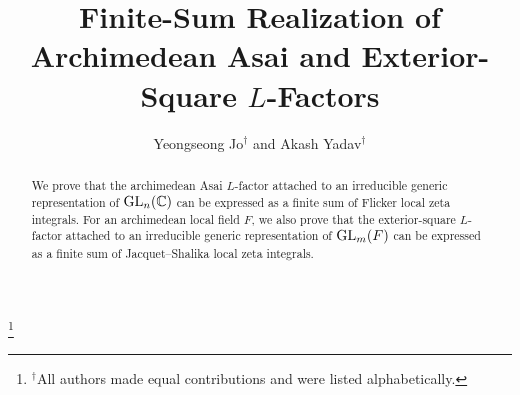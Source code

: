 \documentclass[12pt,reqno]{amsart}
\numberwithin{equation}{section}%
\numberwithin{equation}{subsection}
\theoremstyle{definition}
\theoremstyle{remark}
\begin{document}
\title{Finite-Sum Realization of Archimedean Asai and Exterior-Square $L$-Factors}
\author[Yeongseong Jo and Akash Yadav]{Yeongseong Jo$^{\dagger}$ and Akash Yadav$^{\dagger}$}
\thanks{$^{\dagger}$All authors made equal contributions and were listed alphabetically.}
\address{(Y. Jo) Department of Mathematics Education / Human-Centered Artificial Intelligence Research Institute, Ewha Womans University, Seoul 03760, Republic of Korea}
\address{(A. Yadav) Human-Centered Artificial Intelligence Research Institute, Ewha Womans University, Seoul 03760, Republic of Korea}


\begin{abstract}
We prove that the archimedean Asai \(L\)-factor attached to an
irreducible generic representation of \({\rm GL}_n(\mathbb{C})\) can be
expressed as a finite sum of Flicker local zeta integrals. For an
archimedean local field \(F\), we also prove that the exterior-square
\(L\)-factor attached to an irreducible generic representation of
\({\rm GL}_m(F)\) can be expressed as a finite sum of Jacquet--Shalika local
zeta integrals.
\end{abstract}
\maketitle
\end{document}
